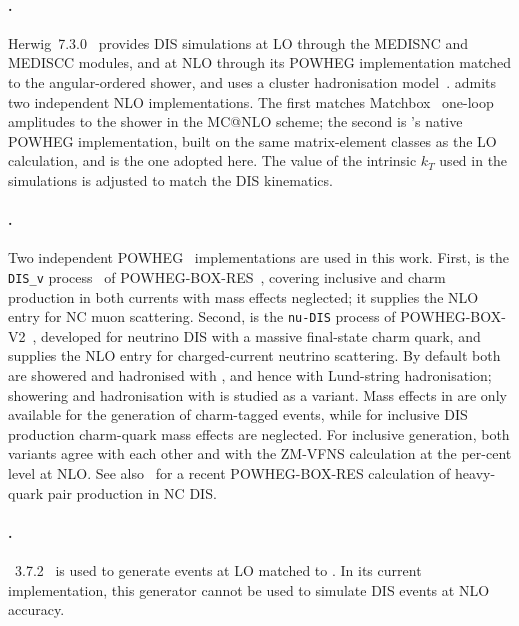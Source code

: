 \paragraph{\herwig.}  {\sc\small Herwig}~7.3.0~\cite{Bellm:2015jjp,Bewick:2023tfi} provides DIS simulations at LO through the {\sc MEDISNC} and {\sc MEDISCC} modules, and at NLO through its POWHEG implementation matched to the angular-ordered shower, and uses a cluster hadronisation model~\cite{Webber:1983if}.
%
\herwig admits two independent NLO implementations.  The first matches {\sc
Matchbox}~\cite{Platzer:2011bc} one-loop amplitudes to the shower in the MC@NLO scheme; the second is
\herwig's native POWHEG implementation, built on the same matrix-element classes as
the LO calculation, and is the one adopted here. 
%
The value of the intrinsic $k_T$ used in the \herwig simulations is adjusted to match the DIS kinematics. 

\paragraph{\powheg.}  Two independent POWHEG~\cite{Nason:2004rx,Frixione:2007vw,Alioli:2010xd}
implementations are used in this work.
%
First,
\powhegres is the
{\tt DIS\_v} process~\cite{Banfi:2023mhz} of POWHEG-BOX-RES~\cite{Jezo:2015aia}, covering inclusive and charm
production in both currents with mass effects neglected; it supplies the NLO
entry for NC muon scattering. 
%
Second, \powhegtwo is the {\tt nu-DIS}
process of POWHEG-BOX-V2~\cite{Buonocore:2024pdv}, developed for neutrino DIS with a massive
final-state charm quark, and supplies the NLO entry for charged-current
neutrino scattering.  
%
By default both are showered and hadronised with \pythia, and hence with
Lund-string hadronisation; showering and hadronisation with \herwig is studied as a variant.
%
Mass effects in \powhegtwo are only available for the generation of charm-tagged events, while for inclusive DIS production charm-quark mass effects are neglected. 
%
For inclusive generation, both \powheg variants agree with each other and with the ZM-VFNS \yadism calculation at the per-cent level at NLO. 
%
See also~\cite{Castro:2026xyr} for a recent POWHEG-BOX-RES calculation of heavy-quark pair production in NC DIS.

\paragraph{\mgamc.}  \mgamc~3.7.2~\cite{Alwall:2014hca} is used to generate events at LO matched to \pythia.
%
In its current implementation, this generator cannot be used to simulate DIS events at NLO accuracy.

